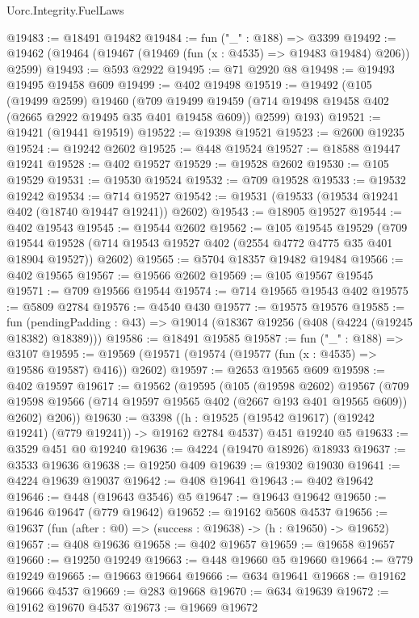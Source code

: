 \begin{lexlean}{Uorc.Integrity.FuelLaws}
\begin{coremodule}
@19483 := @18491 @19482
@19484 := fun ("_" : @188) => @3399
@19492 := @19462 (@19464 (@19467 (@19469 (fun (x : @4535) => @19483 @19484) @206)) @2599)
@19493 := @593 @2922
@19495 := @71 @2920 @8
@19498 := @19493 @19495 @19458 @609
@19499 := @402 @19498
@19519 := @19492
    (@105
      (@19499 @2599)
      @19460
      (@709 @19499 @19459 (@714 @19498 @19458 @402 (@2665 @2922 @19495 @35 @401 @19458 @609)) @2599)
      @193)
@19521 := @19421 (@19441 @19519)
@19522 := @19398 @19521
@19523 := @2600 @19235
@19524 := @19242 @2602
@19525 := @448 @19524
@19527 := @18588 @19447 @19241
@19528 := @402 @19527
@19529 := @19528 @2602
@19530 := @105 @19529
@19531 := @19530 @19524
@19532 := @709 @19528
@19533 := @19532 @19242
@19534 := @714 @19527
@19542 := @19531 (@19533 (@19534 @19241 @402 (@18740 @19447 @19241)) @2602)
@19543 := @18905 @19527
@19544 := @402 @19543
@19545 := @19544 @2602
@19562 := @105
    @19545
    @19529
    (@709 @19544 @19528 (@714 @19543 @19527 @402 (@2554 @4772 @4775 @35 @401 @18904 @19527)) @2602)
@19565 := @5704 @18357 @19482 @19484
@19566 := @402 @19565
@19567 := @19566 @2602
@19569 := @105 @19567 @19545
@19571 := @709 @19566 @19544
@19574 := @714 @19565 @19543 @402
@19575 := @5809 @2784
@19576 := @4540 @430
@19577 := @19575 @19576
@19585 := fun (pendingPadding : @43) => @19014 (@18367 @19256 (@408 (@4224 (@19245 @18382) @18389)))
@19586 := @18491 @19585
@19587 := fun ("_" : @188) => @3107
@19595 := @19569 (@19571 (@19574 (@19577 (fun (x : @4535) => @19586 @19587) @416)) @2602)
@19597 := @2653 @19565 @609
@19598 := @402 @19597
@19617 := @19562
    (@19595
      (@105
        (@19598 @2602)
        @19567
        (@709 @19598 @19566 (@714 @19597 @19565 @402 (@2667 @193 @401 @19565 @609)) @2602)
        @206))
@19630 := @3398
    ((h : @19525 (@19542 @19617) (@19242 @19241) (@779 @19241)) -> @19162 @2784 @4537)
    @451
    @19240
    @5
@19633 := @3529 @451 @0 @19240
@19636 := @4224 (@19470 @18926) @18933
@19637 := @3533 @19636
@19638 := @19250 @409
@19639 := @19302 @19030
@19641 := @4224 @19639 @19037
@19642 := @408 @19641
@19643 := @402 @19642
@19646 := @448 (@19643 @3546) @5
@19647 := @19643 @19642
@19650 := @19646 @19647 (@779 @19642)
@19652 := @19162 @5608 @4537
@19656 := @19637 (fun (after : @0) => (success : @19638) -> (h : @19650) -> @19652)
@19657 := @408 @19636
@19658 := @402 @19657
@19659 := @19658 @19657
@19660 := @19250 @19249
@19663 := @448 @19660 @5 @19660
@19664 := @779 @19249
@19665 := @19663 @19664
@19666 := @634 @19641
@19668 := @19162 @19666 @4537
@19669 := @283 @19668
@19670 := @634 @19639
@19672 := @19162 @19670 @4537
@19673 := @19669 @19672

\end{coremodule}
\end{lexlean}
